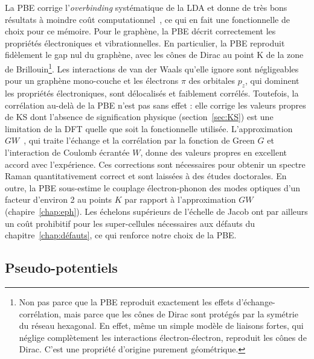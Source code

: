 La PBE corrige l'\textit{overbinding} systématique de la LDA et donne de très bons résultats à moindre coût computationnel~\cite{kurthMolecularSolidstateTests1999,mounetFirstprinciplesDeterminationStructural2005a}, ce qui en fait une fonctionnelle de choix pour ce mémoire. Pour le graphène, la PBE décrit correctement les propriétés électroniques et vibrationnelles. En particulier, la PBE reproduit fidèlement le gap nul du graphène, avec les cônes de Dirac au point K de la zone de Brillouin\footnote{Non pas parce que la PBE reproduit exactement les effets d'échange-corrélation, mais parce que les cônes de Dirac sont protégés par la symétrie du réseau hexagonal. En effet, même un simple modèle de liaisons fortes, qui néglige complètement les interactions électron-électron, reproduit les cônes de Dirac. C'est une propriété d'origine purement géométrique.}. Les interactions de van der Waals qu'elle ignore sont négligeables pour un graphène mono-couche et les électrons $\pi$ des orbitales $p_z$, qui dominent les propriétés électroniques, sont délocalisés et faiblement corrélés. Toutefois, la corrélation au-delà de la PBE n'est pas sans effet : elle corrige les  valeurs propres de KS dont l'absence de signification physique (section~\ref{sec:KS}) est une limitation de la DFT quelle que soit la fonctionnelle utilisée. L'approximation $GW$~\cite{hedinNewMethodCalculating1965,hybertsenElectronCorrelationSemiconductors1986}, qui traite l'échange et la corrélation par la fonction de Green $G$ et l'interaction de Coulomb écrantée $W$, donne des valeurs propres en excellent accord avec l'expérience. Ces corrections sont nécessaires pour obtenir un spectre Raman quantitativement correct et sont laissées à des études doctorales. En outre, la PBE sous-estime le couplage électron-phonon des modes optiques d'un facteur d'environ 2 au points $K$ par rapport à l'approximation $GW$~\cite{lazzeriImpactElectronelectronCorrelation2008} (chapire~\ref{chap:eph}). Les échelons supérieurs de l'échelle de Jacob ont par ailleurs un coût prohibitif pour les super-cellules nécessaires aux défauts du chapitre~\ref{chap:défauts}, ce qui renforce notre choix de la PBE.


\subsection{Pseudo-potentiels}\label{sec:PP}

